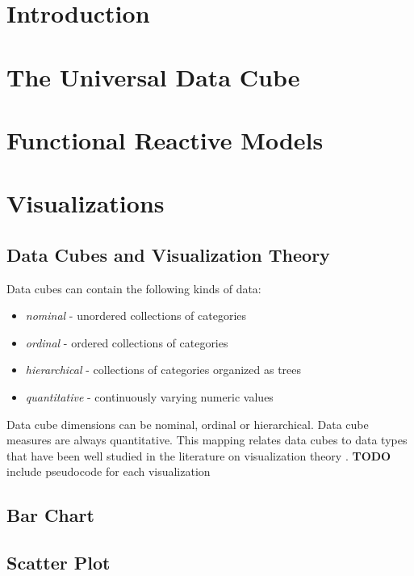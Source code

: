 \documentclass[12pt]{report}
\newcommand{\TODO}[1]{{ \color{red}\textbf{TODO} #1 }}
\begin{document}
\begin{doublespace}

\chapter{Introduction}


\pagebreak
\chapter{The Universal Data Cube}


\pagebreak
\chapter{Functional Reactive Models}


\pagebreak
\chapter{Visualizations}
\section{Data Cubes and Visualization Theory}
Data cubes can contain the following kinds of data:
\begin{itemize}
\item \emph{nominal} - unordered collections of categories
\item \emph{ordinal} - ordered collections of categories
\item \emph{hierarchical} - collections of categories organized as trees
\item \emph{quantitative} - continuously varying numeric values
\end{itemize}
Data cube dimensions can be nominal, ordinal or hierarchical. Data cube measures are always quantitative. This mapping relates data cubes to data types that have been well studied in the literature on visualization theory \cite{bertin1983semiology, mackinlay1986automating, graham2010survey}.
\TODO{ include pseudocode for each visualization}
\section{Bar Chart}
\section{Scatter Plot}

\end{doublespace}
\end{document}
